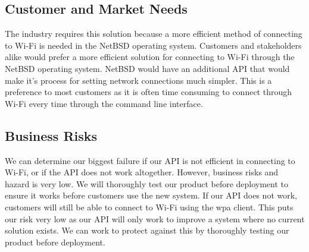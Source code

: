 \subsection{Customer and Market Needs}

The industry requires this solution because a more efficient method of connecting to Wi-Fi is needed in the NetBSD operating system. Customers and 
stakeholders alike would prefer a more efficient solution for connecting to Wi-Fi through the NetBSD operating system. NetBSD would have an additional 
API that would make it’s process for setting network connections much simpler. This is a preference to most customers as it is often time consuming to 
connect through Wi-Fi every time through the command line interface. 

\subsection{Business Risks}

We can determine our biggest failure if our API is not efficient in connecting to Wi-Fi, or if the API does not work altogether. However, business risks 
and hazard is very low. We will thoroughly test our product before deployment to ensure it works before customers use the new system. If our API does not work, 
customers will still be able to connect to Wi-Fi using the wpa client. This puts our risk very low as our API will only work to improve a system where no current 
solution exists. We can work to protect against this by thoroughly testing our product before deployment. 

